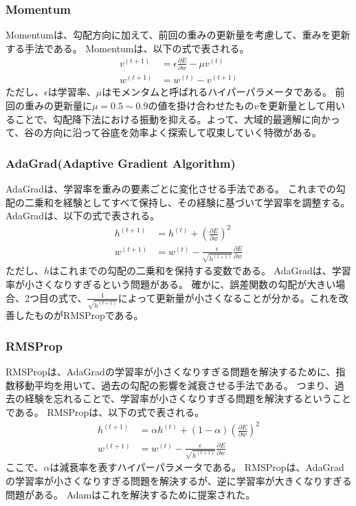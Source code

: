 \documentclass{ltjsarticle}
\begin{document}
\subsubsection{Momentum}
Momentumは、勾配方向に加えて、前回の重みの更新量を考慮して、重みを更新する手法である。
Momentumは、以下の式で表される。
\begin{align}
  v^{(t+1)} &= \epsilon \frac{\partial E}{\partial w} - \mu v^{(t)} \\
  w^{(t+1)} &= w^{(t)} - v^{(t+1)}
\end{align}
ただし、$\epsilon$は学習率、$\mu$はモメンタムと呼ばれるハイパーパラメータである。
前回の重みの更新量に$\mu = 0.5 \sim 0.9$の値を掛け合わせたもの$v$を更新量として用いることで、勾配降下法における振動を抑える。よって、大域的最適解に向かって、谷の方向に沿って谷底を効率よく探索して収束していく特徴がある。

\subsubsection{AdaGrad(Adaptive Gradient Algorithm)}
AdaGradは、学習率を重みの要素ごとに変化させる手法である。
これまでの勾配の二乗和を経験としてすべて保持し、その経験に基づいて学習率を調整する。
AdaGradは、以下の式で表される。
\begin{align}
  h^{(t+1)} &= h^{(t)} + \left( \frac{\partial E}{\partial w} \right)^2 \\
  w^{(t+1)} &= w^{(t)} - \frac{\epsilon}{\sqrt{h^{(t+1)}}} \frac{\partial E}{\partial w}
\end{align}
ただし、$h$はこれまでの勾配の二乗和を保持する変数である。
AdaGradは、学習率が小さくなりすぎるという問題がある。
確かに、誤差関数の勾配が大きい場合、2つ目の式で、$\frac{1}{\sqrt{h^{(t+1)}}}$によって更新量が小さくなることが分かる。これを改善したものがRMSPropである。


\subsubsection{RMSProp}
RMSPropは、AdaGradの学習率が小さくなりすぎる問題を解決するために、指数移動平均を用いて、過去の勾配の影響を減衰させる手法である。
つまり、過去の経験を忘れることで、学習率が小さくなりすぎる問題を解決するということである。
RMSPropは、以下の式で表される。
\begin{align}
  h^{(t+1)} &= \alpha h^{(t)} + (1 - \alpha) \left( \frac{\partial E}{\partial w} \right)^2 \\
  w^{(t+1)} &= w^{(t)} - \frac{\epsilon}{\sqrt{h^{(t+1)}}} \frac{\partial E}{\partial w}
\end{align}
ここで、$\alpha$は減衰率を表すハイパーパラメータである。
RMSPropは、AdaGradの学習率が小さくなりすぎる問題を解決するが、逆に学習率が大きくなりすぎる問題がある。
Adamはこれを解決するために提案された。
\end{document}
